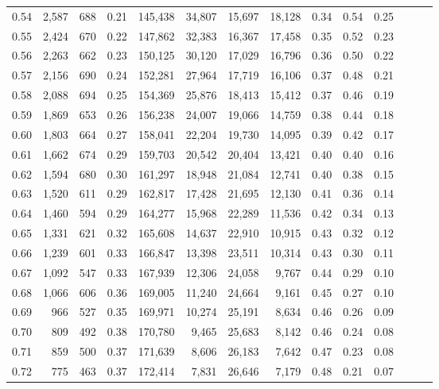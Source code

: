 \begin{tabular}{rrrrrrrrrrrrrr}
0.54 &  2,587 &  688 &  0.21 &  145,438 &   34,807 &  15,697 &  18,128 &  0.34 &  0.54 &      0.25 \\
0.55 &  2,424 &  670 &  0.22 &  147,862 &   32,383 &  16,367 &  17,458 &  0.35 &  0.52 &      0.23 \\
0.56 &  2,263 &  662 &  0.23 &  150,125 &   30,120 &  17,029 &  16,796 &  0.36 &  0.50 &      0.22 \\
0.57 &  2,156 &  690 &  0.24 &  152,281 &   27,964 &  17,719 &  16,106 &  0.37 &  0.48 &      0.21 \\
0.58 &  2,088 &  694 &  0.25 &  154,369 &   25,876 &  18,413 &  15,412 &  0.37 &  0.46 &      0.19 \\
0.59 &  1,869 &  653 &  0.26 &  156,238 &   24,007 &  19,066 &  14,759 &  0.38 &  0.44 &      0.18 \\
0.60 &  1,803 &  664 &  0.27 &  158,041 &   22,204 &  19,730 &  14,095 &  0.39 &  0.42 &      0.17 \\
0.61 &  1,662 &  674 &  0.29 &  159,703 &   20,542 &  20,404 &  13,421 &  0.40 &  0.40 &      0.16 \\
0.62 &  1,594 &  680 &  0.30 &  161,297 &   18,948 &  21,084 &  12,741 &  0.40 &  0.38 &      0.15 \\
0.63 &  1,520 &  611 &  0.29 &  162,817 &   17,428 &  21,695 &  12,130 &  0.41 &  0.36 &      0.14 \\
0.64 &  1,460 &  594 &  0.29 &  164,277 &   15,968 &  22,289 &  11,536 &  0.42 &  0.34 &      0.13 \\
0.65 &  1,331 &  621 &  0.32 &  165,608 &   14,637 &  22,910 &  10,915 &  0.43 &  0.32 &      0.12 \\
0.66 &  1,239 &  601 &  0.33 &  166,847 &   13,398 &  23,511 &  10,314 &  0.43 &  0.30 &      0.11 \\
0.67 &  1,092 &  547 &  0.33 &  167,939 &   12,306 &  24,058 &   9,767 &  0.44 &  0.29 &      0.10 \\
0.68 &  1,066 &  606 &  0.36 &  169,005 &   11,240 &  24,664 &   9,161 &  0.45 &  0.27 &      0.10 \\
0.69 &    966 &  527 &  0.35 &  169,971 &   10,274 &  25,191 &   8,634 &  0.46 &  0.26 &      0.09 \\
0.70 &    809 &  492 &  0.38 &  170,780 &    9,465 &  25,683 &   8,142 &  0.46 &  0.24 &      0.08 \\
0.71 &    859 &  500 &  0.37 &  171,639 &    8,606 &  26,183 &   7,642 &  0.47 &  0.23 &      0.08 \\
0.72 &    775 &  463 &  0.37 &  172,414 &    7,831 &  26,646 &   7,179 &  0.48 &  0.21 &      0.07 \\

\end{tabular}
